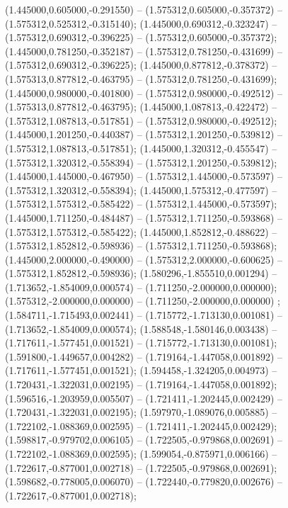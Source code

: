  (1.445000,0.605000,-0.291550) -- (1.575312,0.605000,-0.357372) -- (1.575312,0.525312,-0.315140);
 (1.445000,0.690312,-0.323247) -- (1.575312,0.690312,-0.396225) -- (1.575312,0.605000,-0.357372);
 (1.445000,0.781250,-0.352187) -- (1.575312,0.781250,-0.431699) -- (1.575312,0.690312,-0.396225);
 (1.445000,0.877812,-0.378372) -- (1.575313,0.877812,-0.463795) -- (1.575312,0.781250,-0.431699);
 (1.445000,0.980000,-0.401800) -- (1.575312,0.980000,-0.492512) -- (1.575313,0.877812,-0.463795);
 (1.445000,1.087813,-0.422472) -- (1.575312,1.087813,-0.517851) -- (1.575312,0.980000,-0.492512);
 (1.445000,1.201250,-0.440387) -- (1.575312,1.201250,-0.539812) -- (1.575312,1.087813,-0.517851);
 (1.445000,1.320312,-0.455547) -- (1.575312,1.320312,-0.558394) -- (1.575312,1.201250,-0.539812);
 (1.445000,1.445000,-0.467950) -- (1.575312,1.445000,-0.573597) -- (1.575312,1.320312,-0.558394);
 (1.445000,1.575312,-0.477597) -- (1.575312,1.575312,-0.585422) -- (1.575312,1.445000,-0.573597);
 (1.445000,1.711250,-0.484487) -- (1.575312,1.711250,-0.593868) -- (1.575312,1.575312,-0.585422);
 (1.445000,1.852812,-0.488622) -- (1.575312,1.852812,-0.598936) -- (1.575312,1.711250,-0.593868);
 (1.445000,2.000000,-0.490000) -- (1.575312,2.000000,-0.600625) -- (1.575312,1.852812,-0.598936);
 (1.580296,-1.855510,0.001294) -- (1.713652,-1.854009,0.000574) -- (1.711250,-2.000000,0.000000);
 (1.575312,-2.000000,0.000000) -- (1.711250,-2.000000,0.000000) ;
 (1.584711,-1.715493,0.002441) -- (1.715772,-1.713130,0.001081) -- (1.713652,-1.854009,0.000574);
 (1.588548,-1.580146,0.003438) -- (1.717611,-1.577451,0.001521) -- (1.715772,-1.713130,0.001081);
 (1.591800,-1.449657,0.004282) -- (1.719164,-1.447058,0.001892) -- (1.717611,-1.577451,0.001521);
 (1.594458,-1.324205,0.004973) -- (1.720431,-1.322031,0.002195) -- (1.719164,-1.447058,0.001892);
 (1.596516,-1.203959,0.005507) -- (1.721411,-1.202445,0.002429) -- (1.720431,-1.322031,0.002195);
 (1.597970,-1.089076,0.005885) -- (1.722102,-1.088369,0.002595) -- (1.721411,-1.202445,0.002429);
 (1.598817,-0.979702,0.006105) -- (1.722505,-0.979868,0.002691) -- (1.722102,-1.088369,0.002595);
 (1.599054,-0.875971,0.006166) -- (1.722617,-0.877001,0.002718) -- (1.722505,-0.979868,0.002691);
 (1.598682,-0.778005,0.006070) -- (1.722440,-0.779820,0.002676) -- (1.722617,-0.877001,0.002718);
